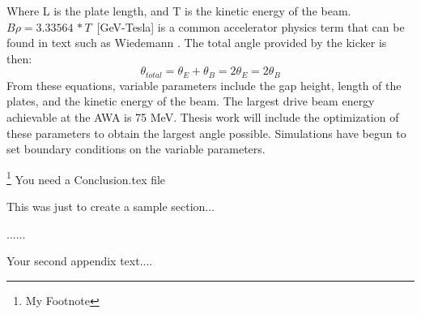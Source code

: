 \documentclass{iitthesis}
\begin{document}
Where L is the plate length, and T is the kinetic energy of the beam. $B\rho=3.33564\,*T\,$ [GeV-Tesla] is a 
common accelerator physics term that can be found in text such as Wiedemann \cite{Wiedemann}. 
The total angle provided by the kicker is then: 
\begin{equation}
\theta_{total}= \theta_E+\theta_B=2\theta_E=2\theta_B
\end{equation}
From these equations, variable parameters include the gap height, length of the plates, and 
the kinetic energy of the beam. The largest drive beam energy achievable at the AWA is 75 MeV. 
Thesis work will include the optimization of these parameters to obtain the largest angle possible.
Simulations have begun to set boundary conditions on the variable parameters. 





\footnote{My Footnote} 
%   
You need a Conclusion.tex file



This was just to create a sample section...

\clearpage


%
%
\appendix


......



Your second appendix text....

\newpage
%
%


\end{document}
